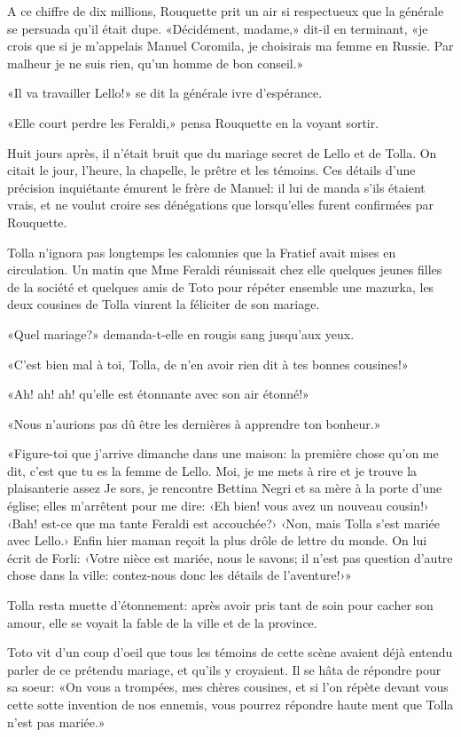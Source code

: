 A ce chiffre de dix millions, Rouquette prit un air si respectueux que
la générale se persuada qu'il était dupe. «Décidément, madame,» dit-il
en terminant, «je crois que si je m'appelais Manuel Coromila, je
choisirais ma femme en Russie. Par malheur je ne suis rien, qu'un homme
de bon conseil.»

«Il va travailler Lello!» se dit la générale ivre d'espérance.

«Elle court perdre les Feraldi,» pensa Rouquette en la voyant sortir.

Huit jours après, il n'était bruit que du mariage secret de Lello et de
Tolla. On citait le jour, l'heure, la chapelle, le prêtre et les
témoins. Ces détails d'une précision inquiétante émurent le frère de
Manuel: il lui de manda s'ils étaient vrais, et ne voulut croire ses
dénégations que lorsqu'elles furent confirmées par Rouquette.

Tolla n'ignora pas longtemps les calomnies que la Fratief avait mises en
circulation. Un matin que Mme Feraldi réunissait chez elle quelques
jeunes filles de la société et quelques amis de Toto pour répéter
ensemble une mazurka, les deux cousines de Tolla vinrent la féliciter de
son mariage.

«Quel mariage?» demanda-t-elle en rougis sang jusqu'aux yeux.

«C'est bien mal à toi, Tolla, de n'en avoir rien dit à tes bonnes
cousines!»

«Ah! ah! ah! qu'elle est étonnante avec son air étonné!»

«Nous n'aurions pas dû être les dernières à apprendre ton bonheur.»

«Figure-toi que j'arrive dimanche dans une maison: la première chose
qu'on me dit, c'est que tu es la femme de Lello. Moi, je me mets à rire
et je trouve la plaisanterie assez Je sors, je rencontre Bettina Negri
et sa mère à la porte d'une église; elles m'arrêtent pour me dire: ‹Eh
bien! vous avez un nouveau cousin!› ‹Bah! est-ce que ma tante Feraldi
est accouchée?› ‹Non, mais Tolla s'est mariée avec Lello.› Enfin hier
maman reçoit la plus drôle de lettre du monde. On lui écrit de Forli:
‹Votre nièce est mariée, nous le savons; il n'est pas question d'autre
chose dans la ville: contez-nous donc les détails de l'aventure!›»

Tolla resta muette d'étonnement: après avoir pris tant de soin pour
cacher son amour, elle se voyait la fable de la ville et de la province.

Toto vit d'un coup d'oeil que tous les témoins de cette scène avaient
déjà entendu parler de ce prétendu mariage, et qu'ils y croyaient. Il se
hâta de répondre pour sa soeur: «On vous a trompées, mes chères
cousines, et si l'on répète devant vous cette sotte invention de nos
ennemis, vous pourrez répondre haute ment que Tolla n'est pas mariée.»

